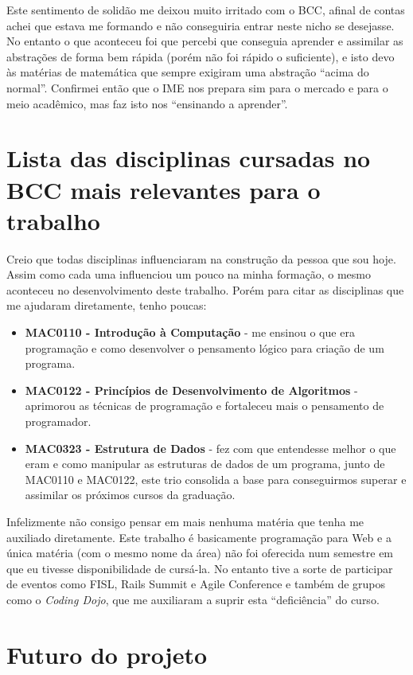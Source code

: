 \documentclass[11pt,a4paper]{article}
\begin{document}
Este sentimento de solidão me deixou muito irritado com o BCC, afinal de contas achei que estava me formando e não conseguiria entrar neste nicho se desejasse. No entanto o que aconteceu foi que percebi que conseguia aprender e assimilar as abstrações de forma bem rápida (porém não foi rápido o suficiente), e isto devo às matérias de matemática que sempre exigiram uma abstração ``acima do normal''. Confirmei então que o IME nos prepara sim para o mercado e para o meio acadêmico, mas faz isto nos ``ensinando a aprender''.

\section{Lista das disciplinas cursadas no BCC mais relevantes para o trabalho}
Creio que todas disciplinas influenciaram na construção da pessoa que sou hoje. Assim como cada uma influenciou um pouco na minha formação, o mesmo aconteceu no desenvolvimento deste trabalho. Porém para citar as disciplinas que me ajudaram diretamente, tenho poucas:

\begin{itemize}
	\item \textbf{MAC0110 - Introdução à Computação} - me ensinou o que era programação e como desenvolver o pensamento lógico para criação de um programa.
	\item \textbf{MAC0122 - Princípios de Desenvolvimento de Algoritmos} - aprimorou as técnicas de programação e fortaleceu mais o pensamento de programador.
	\item \textbf{MAC0323 - Estrutura de Dados} - fez com que entendesse melhor o que eram e como manipular as estruturas de dados de um programa, junto de MAC0110 e MAC0122, este trio consolida a base para conseguirmos superar e assimilar os próximos cursos da graduação.
\end{itemize}

Infelizmente não consigo pensar em mais nenhuma matéria que tenha me auxiliado diretamente. Este trabalho é basicamente programação para Web e a única matéria (com o mesmo nome da área) não foi oferecida num semestre em que eu tivesse disponibilidade de cursá-la. No entanto tive a sorte de participar de eventos como FISL, Rails Summit e Agile Conference e também de grupos como o \emph{Coding Dojo}, que me auxiliaram a suprir esta ``deficiência'' do curso.






\section{Futuro do projeto}
\end{document}
